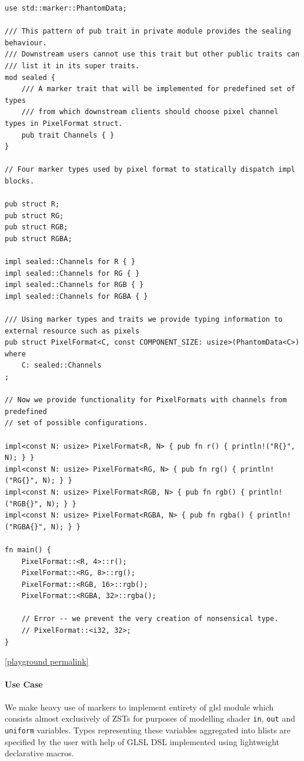 \begin{lstlisting}[basicstyle=\tiny]
use std::marker::PhantomData;

/// This pattern of pub trait in private module provides the sealing behaviour.
/// Downstream users cannot use this trait but other public traits can
/// list it in its super traits.
mod sealed {
    /// A marker trait that will be implemented for predefined set of types
    /// from which downstream clients should choose pixel channel types in PixelFormat struct.
    pub trait Channels { }
}

// Four marker types used by pixel format to statically dispatch impl blocks.

pub struct R;
pub struct RG;
pub struct RGB;
pub struct RGBA;

impl sealed::Channels for R { }
impl sealed::Channels for RG { }
impl sealed::Channels for RGB { }
impl sealed::Channels for RGBA { }

/// Using marker types and traits we provide typing information to external resource such as pixels
pub struct PixelFormat<C, const COMPONENT_SIZE: usize>(PhantomData<C>)
where 
    C: sealed::Channels
;

// Now we provide functionality for PixelFormats with channels from predefined
// set of possible configurations.

impl<const N: usize> PixelFormat<R, N> { pub fn r() { println!("R{}", N); } }
impl<const N: usize> PixelFormat<RG, N> { pub fn rg() { println!("RG{}", N); } }
impl<const N: usize> PixelFormat<RGB, N> { pub fn rgb() { println!("RGB{}", N); } }
impl<const N: usize> PixelFormat<RGBA, N> { pub fn rgba() { println!("RGBA{}", N); } }

fn main() {
    PixelFormat::<R, 4>::r();
    PixelFormat::<RG, 8>::rg();
    PixelFormat::<RGB, 16>::rgb();
    PixelFormat::<RGBA, 32>::rgba();
    
    // Error -- we prevent the very creation of nonsensical type.
    // PixelFormat::<i32, 32>;
}
\end{lstlisting}
\noindent \href{https://play.rust-lang.org/?version=stable&mode=debug&edition=2021&gist=7d092a3be5593833894fa27b5fa56757}{[playground permalink]}

\paragraph{Use Case}

We make heavy use of markers to implement entirety of glsl module which consists almost exclusively of ZSTs for purposes of modelling shader \texttt{in}, \texttt{out} and \texttt{uniform} variables.
Types representing these variables aggregated into hlists are specified by the user with help of GLSL DSL implemented using lightweight declarative macros.

